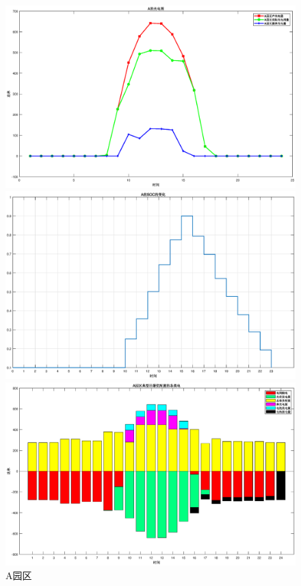 \documentclass{cumcmthesis}
\begin{document}
  \begin{figure}[!h]  
\centering 
\begin{minipage}{.5\textwidth}  
  \centering  
  \includegraphics[width=.9\linewidth]{figures/Q1_3_A_light.eps}  
\end{minipage}%
\begin{minipage}{.5\textwidth}  
  \centering  
  \includegraphics[width=.9\linewidth]{figures/Q1_3_A_SOC.eps}  
\end{minipage}  
\begin{minipage}{.5\textwidth}  
  \centering  
  \includegraphics[width=.9\linewidth]{figures/Q1_3_A_sort.eps}  
\end{minipage}
\caption{A园区}  
   
\end{figure} 
\end{document}

